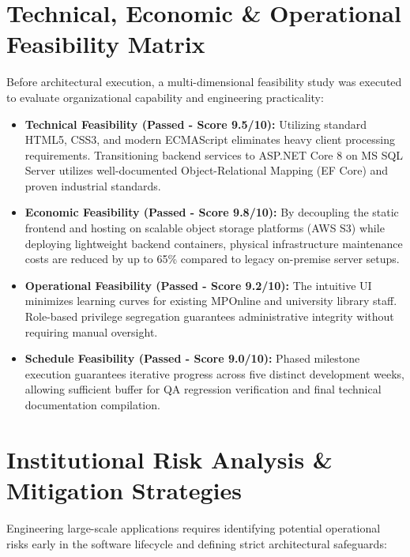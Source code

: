\documentclass[11pt,a4paper]{report}
\begin{document}
\section{Technical, Economic \& Operational Feasibility Matrix}
Before architectural execution, a multi-dimensional feasibility study was executed to evaluate organizational capability and engineering practicality:

\begin{itemize}[leftmargin=1.5em]
    \item \textbf{Technical Feasibility (Passed - Score 9.5/10):} Utilizing standard HTML5, CSS3, and modern ECMAScript eliminates heavy client processing requirements. Transitioning backend services to ASP.NET Core 8 on MS SQL Server utilizes well-documented Object-Relational Mapping (EF Core) and proven industrial standards.
    \item \textbf{Economic Feasibility (Passed - Score 9.8/10):} By decoupling the static frontend and hosting on scalable object storage platforms (AWS S3) while deploying lightweight backend containers, physical infrastructure maintenance costs are reduced by up to 65\% compared to legacy on-premise server setups.
    \item \textbf{Operational Feasibility (Passed - Score 9.2/10):} The intuitive UI minimizes learning curves for existing MPOnline and university library staff. Role-based privilege segregation guarantees administrative integrity without requiring manual oversight.
    \item \textbf{Schedule Feasibility (Passed - Score 9.0/10):} Phased milestone execution guarantees iterative progress across five distinct development weeks, allowing sufficient buffer for QA regression verification and final technical documentation compilation.
\end{itemize}

\section{Institutional Risk Analysis \& Mitigation Strategies}
Engineering large-scale applications requires identifying potential operational risks early in the software lifecycle and defining strict architectural safeguards:
\end{document}
